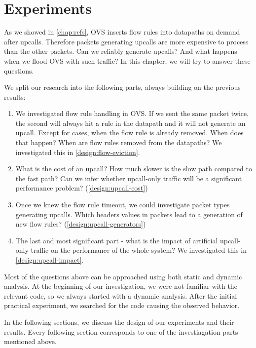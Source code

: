 \chapter{Experiments}
\label{chap:design}

As we showed in \cref{chap:refs}, OVS inserts flow rules into datapaths on demand after upcalls. Therefore packets generating upcalls are more expensive to process than the other packets. Can we reliably generate upcalls? And what happens when we flood OVS with such traffic? In this chapter, we will try to answer these questions.

We split our research into the following parts, always building on the previous results:

\begin{enumerate}
    \item We investigated flow rule handling in OVS. If we sent the same packet twice, the second will always hit a rule in the datapath and it will not generate an upcall. Except for cases, when the flow rule is already removed. When does that happen? When are flow rules removed from the datapaths? We investigated this in \cref{design:flow-eviction}.

    \item What is the cost of an upcall? How much slower is the slow path compared to the fast path? Can we infer whether upcall-only traffic will be a significant performance problem? (\cref{design:upcall-cost})

    \item Once we knew the flow rule timeout, we could investigate packet types generating upcalls. Which headers values in packets lead to a generation of new flow rules? (\cref{design:upcall-generators})

    \item The last and most significant part - what is the impact of artificial upcall-only traffic on the performance of the whole system? We investigated this in \cref{design:upcall-impact}.
\end{enumerate}

Most of the questions above can be approached using both static and dynamic analysis. At the beginning of our investigation, we were not familiar with the relevant code, so we always started with a dynamic analysis. After the initial practical experiment, we searched for the code causing the observed behavior.

In the following sections, we discuss the design of our experiments and their results. Every following section corresponds to one of the investiagation parts mentioned above.

